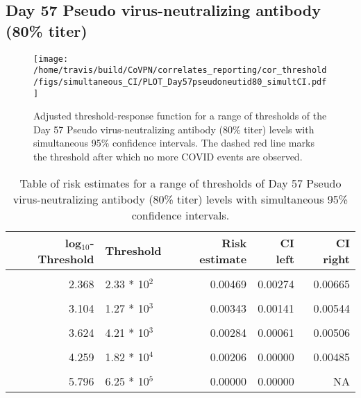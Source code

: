 \documentclass[]{book}
\theoremstyle{definition}
\theoremstyle{definition}
\theoremstyle{definition}
\newcommand{\1}{\mathbbm{1}}
\begin{document}
\newpage

\newpage

\newpage

\hypertarget{day-57-pseudo-virus-neutralizing-antibody-80-titer-2}{%
\subsection{Day 57 Pseudo virus-neutralizing antibody (80\% titer)}\label{day-57-pseudo-virus-neutralizing-antibody-80-titer-2}}

\begin{figure}[H]
\centering
\texttt{[image: /home/travis/build/CoVPN/correlates\_reporting/cor\_threshold/figs/simultaneous\_CI/PLOT\_Day57pseudoneutid80\_simultCI.pdf]}
\caption{Adjusted threshold-response function for a range of thresholds of the
  Day 57 Pseudo virus-neutralizing antibody (80\% titer) levels with simultaneous 95\% confidence intervals. The dashed red line marks the threshold after which no more COVID events are observed. }
\end{figure}
\begin{table}[!h]

\caption{\label{tab:unnamed-chunk-385}Table of risk estimates for a range of thresholds of Day 57 Pseudo virus-neutralizing antibody (80\% titer) levels with simultaneous 95\% confidence intervals.}
\centering
\begin{tabular}[t]{rlrrr}
\toprule
log$_{10}$-Threshold & Threshold & Risk estimate & CI left & CI right\\
\midrule
\cellcolor{gray!6}{1.289} & \cellcolor{gray!6}{1.95 * 10$^1$} & \cellcolor{gray!6}{0.00514} & \cellcolor{gray!6}{0.00323} & \cellcolor{gray!6}{0.00706}\\
2.368 & 2.33 * 10$^2$ & 0.00469 & 0.00274 & 0.00665\\
\cellcolor{gray!6}{2.755} & \cellcolor{gray!6}{5.69 * 10$^2$} & \cellcolor{gray!6}{0.00428} & \cellcolor{gray!6}{0.00229} & \cellcolor{gray!6}{0.00626}\\
3.104 & 1.27 * 10$^3$ & 0.00343 & 0.00141 & 0.00544\\
\cellcolor{gray!6}{3.373} & \cellcolor{gray!6}{2.36 * 10$^3$} & \cellcolor{gray!6}{0.00310} & \cellcolor{gray!6}{0.00107} & \cellcolor{gray!6}{0.00514}\\
3.624 & 4.21 * 10$^3$ & 0.00284 & 0.00061 & 0.00506\\
\cellcolor{gray!6}{3.909} & \cellcolor{gray!6}{8.11 * 10$^3$} & \cellcolor{gray!6}{0.00244} & \cellcolor{gray!6}{0.00015} & \cellcolor{gray!6}{0.00474}\\
4.259 & 1.82 * 10$^4$ & 0.00206 & 0.00000 & 0.00485\\
\cellcolor{gray!6}{4.676} & \cellcolor{gray!6}{4.74 * 10$^4$} & \cellcolor{gray!6}{0.00256} & \cellcolor{gray!6}{0.00000} & \cellcolor{gray!6}{0.00705}\\
5.796 & 6.25 * 10$^5$ & 0.00000 & 0.00000 & NA\\
\bottomrule
\end{tabular}
\end{table}
\end{document}
